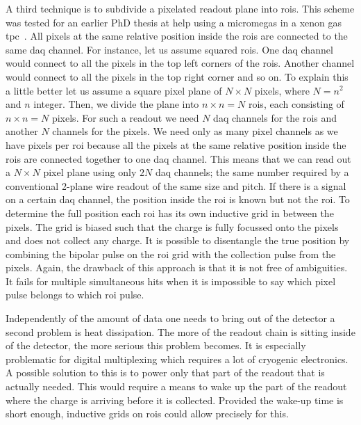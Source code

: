 A third technique is to subdivide a pixelated readout plane into \glspl{roi}.
This scheme was tested for an earlier PhD thesis at \gls{help} using a \gls{micromegas} in a xenon gas \gls{tpc}~\cite{maplesyrup}.
All pixels at the same relative position inside the \glspl{roi} are connected to the same \gls{daq} channel.
For instance, let us assume squared \glspl{roi}.
One \gls{daq} channel would connect to all the pixels in the top left corners of the \glspl{roi}.
Another channel would connect to all the pixels in the top right corner and so on.
To explain this a little better let us assume a square pixel plane of $N \times N$ pixels, where $N = n ^ 2$ and $n$ integer.
Then, we divide the plane into $n \times n = N$ \glspl{roi}, each consisting of $n \times n = N$ pixels.
For such a readout we need $N$ \gls{daq} channels for the \glspl{roi} and another $N$ channels for the pixels.
We need only as many pixel channels as we have pixels per \gls{roi} because all the pixels at the same relative position inside the \glspl{roi} are connected together to one \gls{daq} channel.
This means that we can read out a $N \times N$ pixel plane using only $2 N$ \gls{daq} channels; the same number required by a conventional 2-plane wire readout of the same size and pitch.
If there is a signal on a certain \gls{daq} channel, the position inside the \gls{roi} is known but not the \gls{roi}.
To determine the full position each \gls{roi} has its own inductive grid in between the pixels.
The grid is biased such that the charge is fully focussed onto the pixels and does not collect any charge.
It is possible to disentangle the true position by combining the bipolar pulse on the \gls{roi} grid with the collection pulse from the pixels.
Again, the drawback of this approach is that it is not free of ambiguities.
It fails for multiple simultaneous hits when it is impossible to say which pixel pulse belongs to which \gls{roi} pulse.

Independently of the amount of data one needs to bring out of the detector a second problem is heat dissipation.
The more of the readout chain is sitting inside of the detector, the more serious this problem becomes.
It is especially problematic for digital multiplexing which requires a lot of cryogenic electronics.
A possible solution to this is to power only that part of the readout that is actually needed.
This would require a means to wake up the part of the readout where the charge is arriving before it is collected.
Provided the wake-up time is short enough, inductive grids on \glspl{roi} could allow precisely for this.


